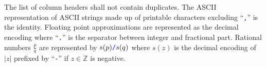\documentclass[a4paper,parskip=half]{article} %
\newcommand*\cmdstyle\texttt
\newcommand*\literalColor{blue}
\newcommand*\literal[1]{\textcolor{\literalColor}{\cmdstyle{#1}}}
\begin{document}
The list of column headers shall not contain duplicates.
The ASCII representation of ASCII strings made up of printable
characters excluding ``\literal,'' is the identity.
Floating point approximations are represented as the decimal encoding
where ``\literal.'' is the separator between integer and fractional
part. Rational numbers $\frac pq$ are represented by $s(p)\literal/s(q)$
where $s(z)$ is the decimal encoding of $|z|$ prefixed by ``\literal-''
if $z\in\mathbb Z$ is negative.
\end{document}
